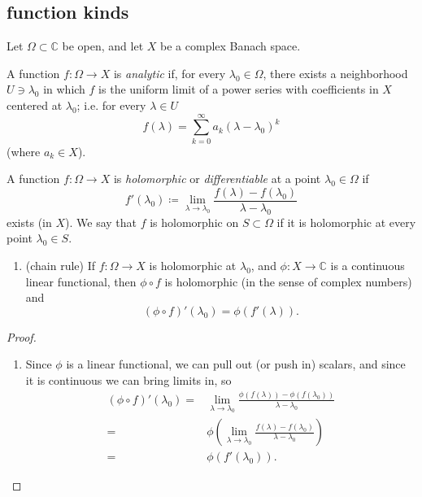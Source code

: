 \documentclass[12pt]{article}
\begin{document}
\begin{refsection}

\subsection{function kinds} %

Let $\Omega\subset\mathbb{C}$ be open, and let $X$ be a complex Banach space.

\begin{definition}
\label{def_analytic}
	A function $f:\Omega\to X$ is \emph{analytic} if, for every $\lambda_0\in\Omega$, there exists a neighborhood $U\ni \lambda_0$ in which $f$ is the uniform limit of a power series with coefficients in $X$ centered at $\lambda_0$; i.e. for every $\lambda\in U$
	\begin{equation*}
		f(\lambda) = \sum_{k=0}^\infty a_k (\lambda - \lambda_0)^k
	\end{equation*}
	(where $a_k\in X$).
\end{definition}

\begin{definition}
	A function $f:\Omega\to X$ is \emph{holomorphic} or \emph{differentiable} at a point $\lambda_0\in\Omega$ if 
	\begin{equation*}
		f'(\lambda_0)\coloneqq \lim_{\lambda\to\lambda_0} \frac{f(\lambda) - f(\lambda_0)}{\lambda - \lambda_0}
	\end{equation*}
	exists (in $X$). We say that $f$ is holomorphic on $S\subset\Omega$ if it is holomorphic at every point $\lambda_0\in S$.
\end{definition}

\begin{proposition}
	\hfill
	\begin{enumerate}
		\item (chain rule) If $f:\Omega\to X$ is holomorphic at $\lambda_0$, and $\phi:X\to\mathbb{C}$ is a continuous linear functional, then $\phi\circ f$ is holomorphic (in the sense of complex numbers) and 
			\begin{equation*}
				(\phi \circ f)'(\lambda_0) = \phi(f'(\lambda)).
			\end{equation*}
	\end{enumerate}
\end{proposition}
\begin{proof}
	\hfill
	\begin{enumerate}
		\item Since $\phi$ is a linear functional, we can pull out (or push in) scalars, and since it is continuous we can bring limits in, so
			\begin{align*}
				(\phi\circ f)'(\lambda_0) =& \lim_{\lambda\to\lambda_0} \frac{\phi(f(\lambda)) - \phi(f(\lambda_0))}{\lambda - \lambda_0} \\
				=& \phi \left( \lim_{\lambda\to\lambda_0} \frac{f(\lambda) - f(\lambda_0)}{\lambda - \lambda_0} \right) \\
				=& \phi(f'(\lambda_0)).
			\end{align*}
	\end{enumerate}
\end{proof}


\end{refsection}
\end{document}
